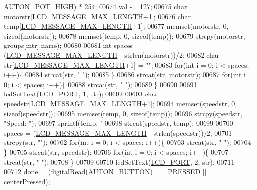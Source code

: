 \begin{DoxyCode}
{{{{{{{{{{      \hyperlink{autonrecorder_8h_a01989d89b8bed150d0aacdaef5ccabd3}{AUTON\_POT\_HIGH}) * 254;
00674         val -= 127;
00675         \textcolor{keywordtype}{char} motorstr[\hyperlink{lcdmsg_8h_abe4c4b70fc6f44ae3680e5b2c68cdd00}{LCD\_MESSAGE\_MAX\_LENGTH}+1];
00676         \textcolor{keywordtype}{char} temp[\hyperlink{lcdmsg_8h_abe4c4b70fc6f44ae3680e5b2c68cdd00}{LCD\_MESSAGE\_MAX\_LENGTH}+1];
00677         memset(motorstr, 0, \textcolor{keyword}{sizeof}(motorstr));
00678         memset(temp, 0, \textcolor{keyword}{sizeof}(temp));
00679         strcpy(motorstr, groups[mtr].name);
00680 
00681         \textcolor{keywordtype}{int} spaces = (\hyperlink{lcdmsg_8h_abe4c4b70fc6f44ae3680e5b2c68cdd00}{LCD\_MESSAGE\_MAX\_LENGTH} - strlen(motorstr))/2;
00682         \textcolor{keywordtype}{char} str[\hyperlink{lcdmsg_8h_abe4c4b70fc6f44ae3680e5b2c68cdd00}{LCD\_MESSAGE\_MAX\_LENGTH}+1] = \textcolor{stringliteral}{""};
00683         \textcolor{keywordflow}{for}(\textcolor{keywordtype}{int} i = 0; i < spaces; i++)\{
00684             strcat(str, \textcolor{stringliteral}{" "});
00685         \}
00686         strcat(str, motorstr);
00687         \textcolor{keywordflow}{for}(\textcolor{keywordtype}{int} i = 0; i < spaces; i++)\{
00688             strcat(str, \textcolor{stringliteral}{" "});
00689         \}
00690 
00691         lcdSetText(\hyperlink{lcdmsg_8h_abcf42bd88b3c36193f301ca25b033875}{LCD\_PORT}, 1, str);
00692 
00693         \textcolor{keywordtype}{char} speedstr[\hyperlink{lcdmsg_8h_abe4c4b70fc6f44ae3680e5b2c68cdd00}{LCD\_MESSAGE\_MAX\_LENGTH}+1];
00694         memset(speedstr, 0, \textcolor{keyword}{sizeof}(speedstr));
00695         memset(temp, 0, \textcolor{keyword}{sizeof}(temp));
00696         strcpy(speedstr, \textcolor{stringliteral}{"Speed: "});
00697         sprintf(temp, \textcolor{stringliteral}{"%
00698         strcat(speedstr, temp);
00699 
00700         spaces = (\hyperlink{lcdmsg_8h_abe4c4b70fc6f44ae3680e5b2c68cdd00}{LCD\_MESSAGE\_MAX\_LENGTH} - strlen(speedstr))/2;
00701         strcpy(str, \textcolor{stringliteral}{""});
00702         \textcolor{keywordflow}{for}(\textcolor{keywordtype}{int} i = 0; i < spaces; i++)\{
00703             strcat(str, \textcolor{stringliteral}{" "});
00704         \}
00705         strcat(str, speedstr);
00706         \textcolor{keywordflow}{for}(\textcolor{keywordtype}{int} i = 0; i < spaces; i++)\{
00707             strcat(str, \textcolor{stringliteral}{" "});
00708         \}
00709 
00710         lcdSetText(\hyperlink{lcdmsg_8h_abcf42bd88b3c36193f301ca25b033875}{LCD\_PORT}, 2, str);
00711 
00712         done = (digitalRead(\hyperlink{autonrecorder_8h_a5e5e9512ca0c5f741113ae51b24258c1}{AUTON\_BUTTON}) == \hyperlink{friendly_8h_a654adff3c664f27f0b29c24af818dd26}{PRESSED} || centerPressed);
}}}}}}}}}}}
\end{DoxyCode}
